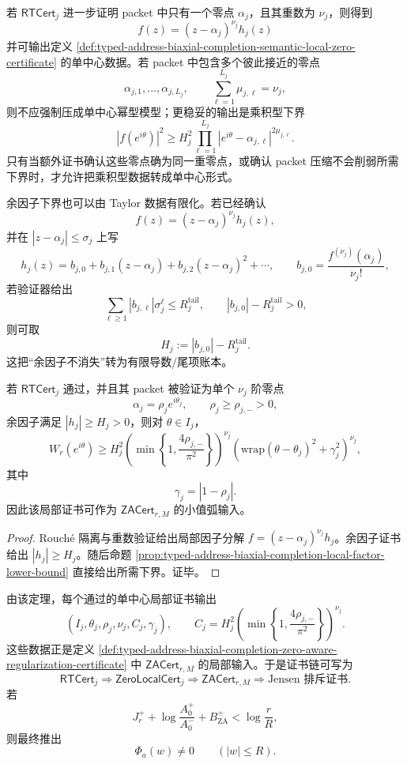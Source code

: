 若 \(\mathsf{RTCert}_j\) 进一步证明 packet 中只有一个零点 \(\alpha_j\)，且其重数为 \(\nu_j\)，则得到
\[
f(z)=(z-\alpha_j)^{\nu_j}h_j(z)
\]
并可输出定义 \ref{def:typed-address-biaxial-completion-semantic-local-zero-certificate} 的单中心数据。若 packet 中包含多个彼此接近的零点
\[
\alpha_{j,1},\ldots,\alpha_{j,L_j},
\qquad
\sum_{\ell=1}^{L_j}\mu_{j,\ell}=\nu_j,
\]
则不应强制压成单中心幂型模型；更稳妥的输出是乘积型下界
\[
|f(e^{i\theta})|^2
\ge
H_j^2
\prod_{\ell=1}^{L_j}
|e^{i\theta}-\alpha_{j,\ell}|^{2\mu_{j,\ell}}.
\]
只有当额外证书确认这些零点确为同一重零点，或确认 packet 压缩不会削弱所需下界时，才允许把乘积型数据转成单中心形式。

余因子下界也可以由 Taylor 数据有限化。若已经确认
\[
f(z)=(z-\alpha_j)^{\nu_j}h_j(z),
\]
并在 \(|z-\alpha_j|\le\sigma_j\) 上写
\[
h_j(z)=
b_{j,0}
+
b_{j,1}(z-\alpha_j)
+
b_{j,2}(z-\alpha_j)^2+\cdots,
\qquad
b_{j,0}=\frac{f^{(\nu_j)}(\alpha_j)}{\nu_j!},
\]
若验证器给出
\[
\sum_{\ell\ge1}|b_{j,\ell}|\sigma_j^\ell
\le
R_j^{\mathrm{tail}},
\qquad
|b_{j,0}|-R_j^{\mathrm{tail}}>0,
\]
则可取
\[
H_j:=|b_{j,0}|-R_j^{\mathrm{tail}}.
\]
这把“余因子不消失”转为有限导数/尾项账本。

\begin{theorem}\label{thm:typed-address-biaxial-completion-rouche-taylor-to-zero-aware-input}
若 \(\mathsf{RTCert}_j\) 通过，并且其 packet 被验证为单个 \(\nu_j\) 阶零点
\[
\alpha_j=\rho_j e^{i\theta_j},
\qquad
\rho_j\ge\rho_{j,-}>0,
\]
余因子满足 \(|h_j|\ge H_j>0\)，则对 \(\theta\in I_j\)，
\[
W_r(e^{i\theta})
\ge
H_j^2
\left(
\min\left\{1,\frac{4\rho_{j,-}}{\pi^2}\right\}
\right)^{\nu_j}
\left(
\mathrm{wrap}(\theta-\theta_j)^2
+
\gamma_j^2
\right)^{\nu_j},
\]
其中
\[
\gamma_j=|1-\rho_j|.
\]
因此该局部证书可作为 \(\mathsf{ZACert}_{r,M}\) 的小值弧输入。
\end{theorem}
\begin{proof}
Rouch\'e 隔离与重数验证给出局部因子分解 \(f=(z-\alpha_j)^{\nu_j}h_j\)。余因子证书给出 \(|h_j|\ge H_j\)。随后命题 \ref{prop:typed-address-biaxial-completion-local-factor-lower-bound} 直接给出所需下界。证毕。
\end{proof}

由该定理，每个通过的单中心局部证书输出
\[
\left(
I_j,\theta_j,\rho_j,\nu_j,C_j,\gamma_j
\right),
\qquad
C_j=
H_j^2
\left(
\min\left\{1,\frac{4\rho_{j,-}}{\pi^2}\right\}
\right)^{\nu_j}.
\]
这些数据正是定义 \ref{def:typed-address-biaxial-completion-zero-aware-regularization-certificate} 中 \(\mathsf{ZACert}_{r,M}\) 的局部输入。于是证书链可写为
\[
\mathsf{RTCert}_j
\Longrightarrow
\mathsf{ZeroLocalCert}_j
\Longrightarrow
\mathsf{ZACert}_{r,M}
\Longrightarrow
\text{Jensen 排斥证书}.
\]
若
\[
J_r^+
+
\log\frac{A_0^+}{A_0^-}
+
B_{\mathrm{ZA}}^+
<
\log\frac rR,
\]
则最终推出
\[
\Phi_a(w)\ne0
\qquad(|w|\le R).
\]


